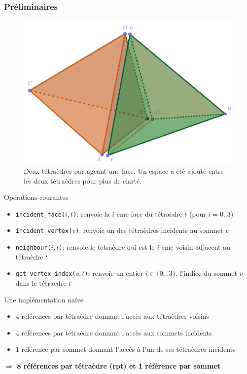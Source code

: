\documentclass[9pt]{beamer}
\begin{document}
\begin{frame}
\footnotesize
\frametitle{Préliminaires}
\begin{figure}
\includegraphics[scale=0.11]{Images/naive}
\caption{Deux tétraèdres partageant une face. Un espace a été ajouté entre les deux tétraèdres pour plus de clarté.}
\end{figure}
\begin{block}{Opérations courantes}
\begin{itemize}
\item \texttt{incident\_face($i,t$)}: renvoie la $i$-ème face du tétraèdre $t$ (pour $i=0..3$)
\item \texttt{incident\_vertex($v$)}: renvoie un des tétraèdres incidents au sommet $v$
\item \texttt{neighbour($i, t$)}: renvoie le tétraèdre qui est le $i$-ème voisin adjacent au tétraèdre $t$
\item \texttt{get\_vertex\_index($v,t$)}: renvoie un entier $i\in\{0 \ldots 3 \}$, l'indice du sommet $v$ dans le tétraèdre $t$
\end{itemize}
\end{block}

\begin{block}{Une implémentation naïve}
\begin{itemize}
\item $4$ références par tétraèdre donnant l'accès aux tétraèdres voisins
\item $4$ références par tétraèdre donnant l'accès aux sommets incidents
\item $1$ référence par sommet donnant l'accès à l'un de ses tétraèdres incidents
\end{itemize}
$\Rightarrow$ \textbf{8 références par tétraèdre (rpt) et 1 référence par sommet}
\end{block}
\end{frame}
\end{document}

